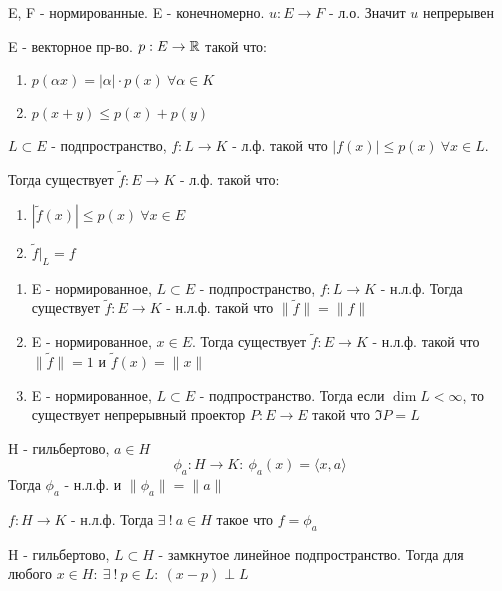 \documentclass[a4paper,12pt]{article}
\begin{document}
\begin{corollary*}
E, F - нормированные. E - конечномерно. $u : E \to F$ - л.о. Значит $u$ непрерывен 
\end{corollary*}

\begin{theorem*}
E - векторное пр-во. $p : E \to \operatorname{\mathbb R}$ такой что:
\begin{enumerate}
    \item $p(\alpha x) = |\alpha| \cdot p(x) \ \forall \alpha \in K$
    \item $p(x + y) \le p(x) + p(y)$
\end{enumerate}
$L \subset E$ - подпространство, $f : L \to K$ - л.ф. такой что $|f(x)| \le p(x) \ \forall x \in L$.

Тогда существует $\tilde{f} : E \to K$ - л.ф. такой что:
\begin{enumerate}
    \item $|\tilde{f}(x)| \le p(x) \ \forall x \in E$
    \item $\tilde{f}|_L = f$
\end{enumerate}
\end{theorem*}

\begin{corollary*}
\begin{enumerate}
    \item E - нормированное, $L \subset E$ - подпространство, $f : L \to K$ - н.л.ф. Тогда существует $\tilde{f} : E \to K$ - н.л.ф. такой что $\|\tilde{f}\| = \|f\|$
    \item E - нормированное, $x \in E$. Тогда существует $\tilde{f} : E \to K$ - н.л.ф. такой что $\|\tilde{f}\| = 1$ и $\tilde{f}(x) = \|x\|$
    \item E - нормированное, $L \subset E$ - подпространство. Тогда если $\dim L < \infty$, то существует непрерывный проектор $P : E \to E$ такой что $\Im P = L$
\end{enumerate}
\end{corollary*}

\begin{claim*}
H - гильбертово, $a \in H$
\[
\phi_a : H \to K : \ \phi_a(x) = \langle x, a \rangle
\]
Тогда $\phi_a$ - н.л.ф. и $\|\phi_a\| = \|a\|$
\end{claim*}

\begin{theorem*}[Рисса]
$f : H \to K$ - н.л.ф. Тогда $\exists \ ! \ a \in H$ такое что $f = \phi_a$
\end{theorem*}

\begin{theorem*}
H - гильбертово, $L \subset H$ - замкнутое линейное подпространство. Тогда для любого $x \in H : \ \exists \ ! \ p \in L : \ (x-p) \perp L$
\end{theorem*}
\end{document}
